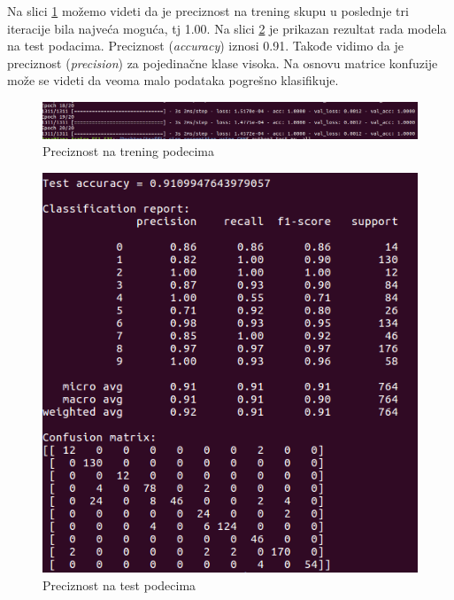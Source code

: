 \documentclass[a4paper]{article}
\begin{document}
Na slici \ref{fig:leNet_trening_acc} možemo videti da je preciznost na trening skupu u poslednje tri iteracije bila najveća moguća, tj 1.00. Na slici \ref{fig:leNet_test_acc} je prikazan rezultat rada modela na test podacima. Preciznost (\textit{accuracy}) iznosi 0.91. Takođe vidimo da je preciznost (\textit{precision}) za pojedinačne klase visoka. Na osnovu matrice konfuzije može se videti da veoma malo podataka pogrešno klasifikuje.


\begin{figure}[h!]
\begin{center}
\includegraphics[scale=0.35]{leNet_trening_acc.png}
\end{center}
\caption{Preciznost na trening podecima}
\label{fig:leNet_trening_acc}
\end{figure}

\begin{figure}[h!]
\begin{center}
\includegraphics[scale=0.45]{leNet_test_acc.png}
\end{center}
\caption{Preciznost na test podecima}
\label{fig:leNet_test_acc}
\end{figure}
\end{document}
